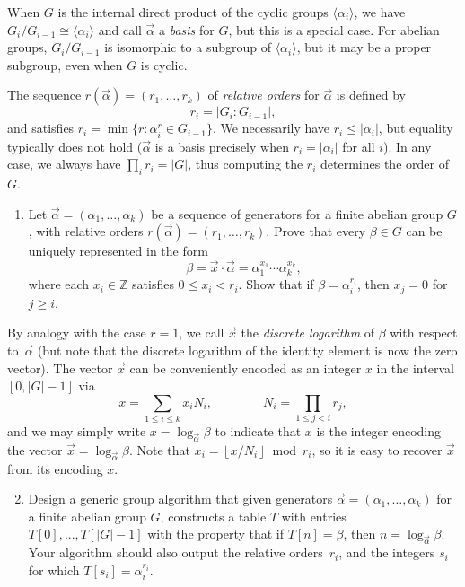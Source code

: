 \documentclass[11pt]{article}
\newcommand{\Z}{\mathbb{Z}}
\theoremstyle{definition}
\begin{document}
When $G$ is the internal direct product of the cyclic groups $\langle\alpha_i\rangle$, we have $G_i/G_{i-1}\cong\langle\alpha_i\rangle$ and call $\vec{\alpha}$ a \emph{basis} for $G$, but this is a special case.  For abelian groups, $G_i/G_{i-1}$ is isomorphic to a subgroup of $\langle\alpha_i\rangle$, but it may be a proper subgroup, even when $G$ is cyclic.

The sequence $r(\vec{\alpha})=(r_1,\ldots,r_k)$ of \emph{relative orders} for $\vec{\alpha}$ is defined by
\begin{equation*}
r_i=|G_i:G_{i-1}|,
\end{equation*}
and satisfies $r_i=\min\{r:\alpha_i^r\in G_{i-1}\}$.
We necessarily have $r_i\le |\alpha_i|$, but equality typically does not hold ($\vec{\alpha}$ is a basis precisely when $r_i=|\alpha_i|$ for all $i$).
In any case, we always have $\prod_i r_i=|G|$, thus computing the $r_i$ determines the order of $G$.

\begin{enumerate}[{\bf (a)}]
\item
Let $\vec{\alpha}=(\alpha_1,\ldots,\alpha_k)$ be a sequence of generators for a finite abelian group $G$, with relative orders $r(\vec{\alpha})=(r_1,\ldots,r_k)$.  Prove that every $\beta\in G$ can be uniquely represented in the form
\[
\beta = \vec{x}\cdot\vec{\alpha} = \alpha_1^{x_1} \cdots \alpha_k^{x_k},
\]
where each $x_i\in\Z$ satisfies $0\le x_i < r_i$.  Show that if $\beta=\alpha_i^{r_i}$, then $x_j=0$ for $j\ge i$.
\end{enumerate}
By analogy with the case $r=1$, we call $\vec{x}$ the \emph{discrete logarithm} of $\beta$ with respect to~$\vec{\alpha}$ (but note that  the discrete logarithm of the identity element is now the zero vector).
The vector $\vec{x}$ can be conveniently encoded as an integer $x$ in the interval $[0,|G|-1]$ via
\[
x = \sum_{1\le i\le k}x_iN_i,\qquad\qquad N_i=\prod_{1\le j< i}r_j,
\]
and we may simply write $x=\log_{\vec{\alpha}}\beta$ to indicate that $x$ is the integer encoding the vector $\vec{x}=\log_{\vec{\alpha}}\beta$.
Note that $x_i=\left\lfloor x/N_i\right\rfloor \bmod r_i$, so it is easy to recover $\vec{x}$ from its encoding $x$.
\begin{enumerate}[{\bf(a)}]
\setcounter{enumi}{1}
\item
Design  a generic group algorithm that given generators $\vec{\alpha}=(\alpha_1,\ldots,\alpha_k)$ for a finite abelian group $G$, constructs a table $T$ with entries $T[0],...,T[|G|-1]$ with the property that if $T[n]=\beta$, then $n=\log_{\vec{\alpha}}\beta$.  Your algorithm should also output the relative orders~$r_i$, and the integers $s_i$ for which $T[s_i]=\alpha_i^{r_i}$.
\end{enumerate}
\end{document}
